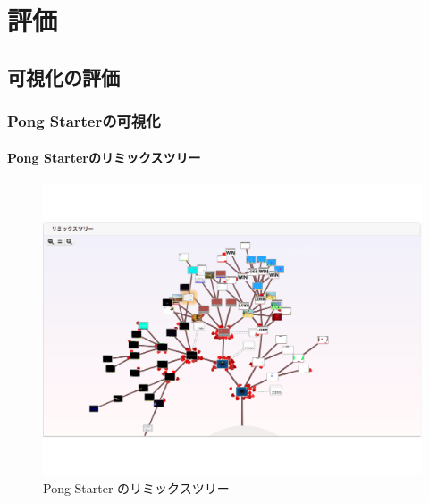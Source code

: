 \documentclass[a4paper,10pt,onecolumn,oneside,openany]{jsbook}
\begin{document}
 




\chapter{評価}

\section{可視化の評価}
\subsection{Pong Starterの可視化}
\subsubsection{Pong Starterのリミックスツリー}
\begin{figure}[ht]
  \centering
    \includegraphics[scale=0.5]{graphic/remixtree_all.pdf}
  \caption{Pong Starter のリミックスツリー}
  \label{psrt}
 \end{figure}
\end{document}
